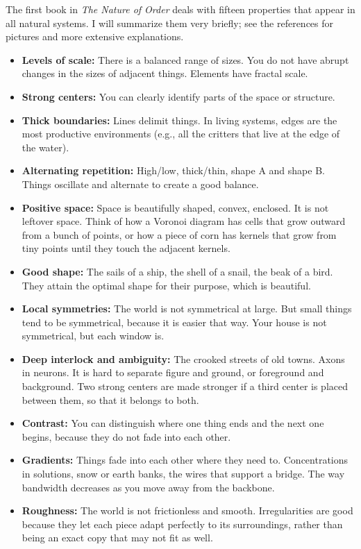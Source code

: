 The first book in \textit{The Nature of Order} deals with fifteen properties that appear in all natural systems. I will summarize them very briefly; see the references for pictures and more extensive explanations.
\begin{itemize}
 \item \textbf{Levels of scale:} There is a balanced range of sizes. You do not have abrupt changes in the sizes of adjacent things. Elements have fractal scale.
 \item \textbf{Strong centers:} You can clearly identify parts of the space or structure.
 \item \textbf{Thick boundaries:} Lines delimit things. In living systems, edges are the most productive environments (e.g., all the critters that live at the edge of the water).
 \item \textbf{Alternating repetition:} High/low, thick/thin, shape A and shape B. Things oscillate and alternate to create a good balance.
 \item \textbf{Positive space:} Space is beautifully shaped, convex, enclosed. It is not leftover space. Think of how a Voronoi diagram has cells that grow outward from a bunch of points, or how a piece of corn has kernels that grow from tiny points until they touch the adjacent kernels.
 \item \textbf{Good shape:} The sails of a ship, the shell of a snail, the beak of a bird. They attain the optimal shape for their purpose, which is beautiful.
 \item \textbf{Local symmetries:} The world is not symmetrical at large. But small things tend to be symmetrical, because it is easier that way. Your house is not symmetrical, but each window is.
 \item \textbf{Deep interlock and ambiguity:} The crooked streets of old towns. Axons in neurons. It is hard to separate figure and ground, or foreground and background.  Two strong centers are made stronger if a third center is placed between them, so that it belongs to both.
 \item \textbf{Contrast:} You can distinguish where one thing ends and the next one begins, because they do not fade into each other.
 \item \textbf{Gradients:} Things fade into each other where they need to. Concentrations in solutions, snow or earth banks, the wires that support a bridge. The way bandwidth decreases as you move away from the backbone.
 \item \textbf{Roughness:} The world is not frictionless and smooth. Irregularities are good because they let each piece adapt perfectly to its surroundings, rather than being an exact copy that may not fit as well.

\end{itemize}
